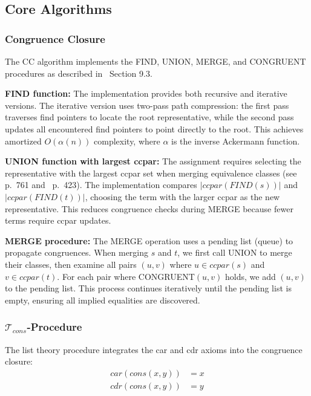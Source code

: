 \documentclass[11pt,a4paper]{article}
\begin{document}
\subsection{Core Algorithms}

\subsubsection{Congruence Closure}

The CC algorithm implements the FIND, UNION, MERGE, and CONGRUENT procedures as described in~\cite{bradley2007calculus} Section 9.3.

\textbf{FIND function:} The implementation provides both recursive and iterative versions. The iterative version uses two-pass path compression: the first pass traverses find pointers to locate the root representative, while the second pass updates all encountered find pointers to point directly to the root. This achieves amortized $O(\alpha(n))$ complexity, where $\alpha$ is the inverse Ackermann function.

\textbf{UNION function with largest ccpar:} The assignment requires selecting the representative with the largest ccpar set when merging equivalence classes (see~\cite{downey1980variations} p.~761 and~\cite{detlefs2005simplify} p.~423). The implementation compares $|ccpar(FIND(s))|$ and $|ccpar(FIND(t))|$, choosing the term with the larger ccpar as the new representative. This reduces congruence checks during MERGE because fewer terms require ccpar updates.

\textbf{MERGE procedure:} The MERGE operation uses a pending list (queue) to propagate congruences. When merging $s$ and $t$, we first call UNION to merge their classes, then examine all pairs $(u, v)$ where $u \in ccpar(s)$ and $v \in ccpar(t)$. For each pair where CONGRUENT$(u, v)$ holds, we add $(u, v)$ to the pending list. This process continues iteratively until the pending list is empty, ensuring all implied equalities are discovered.

\subsubsection{$\mathcal{T}_{cons}$-Procedure}

The list theory procedure integrates the car and cdr axioms into the congruence closure:
\begin{align}
    car(cons(x, y)) &= x \\
    cdr(cons(x, y)) &= y
\end{align}
\end{document}
